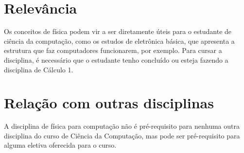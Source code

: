 \documentclass[a4 paper, 10pt]{article}
\begin{document}
\section{Relevância}
Os conceitos de física podem vir a ser diretamente úteis para o estudante de ciência da computação, como os estudos de eletrônica básica, que apresenta a estrutura que faz computadores funcionarem, por exemplo. Para cursar a disciplina, é necessário que o estudante tenho concluído ou esteja fazendo a disciplina de Cálculo 1.

\section{Relação com outras disciplinas}
A disciplina de física para computação não é pré-requisito para nenhuma outra disciplina do curso de Ciência da Computação, mas pode ser pré-requisito para alguma eletiva oferecida para o curso.


\printbibliography
\end{document}
